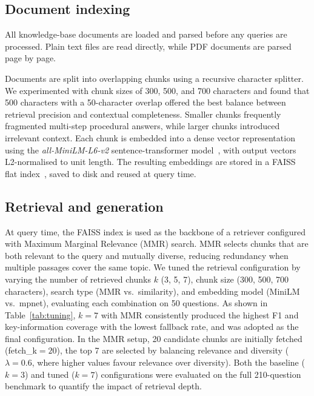 \documentclass[fleqn,moreauthors,10pt]{ds_report}
\begin{document}
\subsection*{Document indexing}

All knowledge-base documents are loaded and parsed before any queries
are processed. Plain text files are read directly, while PDF documents
are parsed page by page. 

Documents are split into overlapping chunks using a recursive character
splitter. We experimented with chunk sizes of 300, 500, and 700
characters and found that 500 characters with a 50-character overlap
offered the best balance between retrieval precision and contextual
completeness. Smaller chunks frequently fragmented multi-step procedural
answers, while larger chunks introduced irrelevant context. Each chunk
is embedded into a dense vector representation using the
\textit{all-MiniLM-L6-v2} sentence-transformer
model~\cite{reimers2019sentencebert}, with output vectors L2-normalised
to unit length. The resulting embeddings are stored in a FAISS flat
index~\cite{johnson2019faiss}, saved to disk and reused at query time.

\subsection*{Retrieval and generation}

At query time, the FAISS index is used as the backbone of a retriever
configured with Maximum Marginal Relevance (MMR) search. MMR selects
chunks that are both relevant to the query and mutually diverse,
reducing redundancy when multiple passages cover the same topic.
We tuned the retrieval configuration by varying the number of retrieved
chunks $k$ (3, 5, 7), chunk size (300, 500, 700 characters), search
type (MMR vs.\ similarity), and embedding model (MiniLM vs.\ mpnet),
evaluating each combination on 50 questions. As shown in
Table~\ref{tab:tuning}, $k{=}7$ with MMR consistently produced the
highest F1 and key-information coverage with the lowest fallback rate,
and was adopted as the final configuration. In the MMR setup, 20
candidate chunks are initially fetched (fetch\_k$=20$), the top 7 are
selected by balancing relevance and diversity ($\lambda{=}0.6$, where
higher values favour relevance over diversity). Both the baseline
($k{=}3$) and tuned ($k{=}7$) configurations were evaluated on the
full 210-question benchmark to quantify the impact of retrieval depth.
\end{document}
